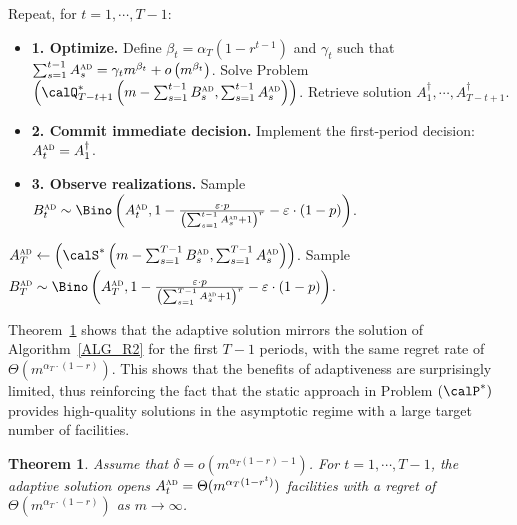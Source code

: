 \documentclass[11pt]{article}
\newtheorem{theorem}{Theorem}[] %
\begin{document}
\begin{algorithm} [h!]
\caption{Adaptive algorithm to solve Problem $(\calP^*)$.}\small
\label{alg:adaptive_R2}
\begin{algorithmic}
\item Repeat, for $t=1,\cdots,T-1$:
\begin{itemize}
    \item[] \textbf{1. Optimize.} Define $\beta_t=\alpha_T\left(1-r^{t-1}\right)$ and $\gamma_t$ such that $\sum_{s=1}^{t-1} A^{\textsc{ad}}_s=\gamma_t m^{\beta_t}+o\left(m^{\beta_t}\right)$. Solve Problem $\left(\calQ^*_{T-t+1}\left(m-\sum_{s=1}^{t-1}B^{\textsc{ad}}_s,\sum_{s=1}^{t-1} A^{\textsc{ad}}_s\right)\right)$. Retrieve solution $A^\dagger_1,\cdots,A^\dagger_{T-t+1}$.
    \item[] \textbf{2. Commit immediate decision.} Implement the first-period decision: $A^{\textsc{ad}}_t=A^\dagger_1$.
    \item[] \textbf{3. Observe realizations.} Sample $B^{\textsc{ad}}_t\sim \Bino\left(A^{\textsc{ad}}_t, 1- \frac{\varepsilon\cdot p}{\left(\sum_{s=1}^{t-1} A^{\textsc{ad}}_s +1\right)^r}-\varepsilon\cdot(1-p)\right)$.
\end{itemize}
\item $A^{\textsc{ad}}_T\gets\left(\calS^*\left(m-\sum_{s=1}^{T-1}B^{\textsc{ad}}_s,\sum_{s=1}^{T-1} A^{\textsc{ad}}_s\right)\right)$. Sample $B^{\textsc{ad}}_T\sim \Bino\left(A^{\textsc{ad}}_T, 1- \frac{\varepsilon\cdot p}{\left(\sum_{s=1}^{T-1} A^{\textsc{ad}}_s +1\right)^r}-\varepsilon\cdot(1-p)\right)$.
\end{algorithmic}
\end{algorithm}

Theorem~\ref{thm:adaptive_R2} shows that the adaptive solution mirrors the solution of Algorithm~\ref{ALG_R2} for the first $T-1$ periods, with the same regret rate of $\Theta\left(m^{\alpha_T\cdot(1-r)}\right)$. This shows that the benefits of adaptiveness are surprisingly limited, thus reinforcing the fact that the static approach in Problem $(\calP^*)$ provides high-quality solutions in the asymptotic regime with a large target number of facilities.
\setcounter{theorem}{3}
\begin{theorem}\label{thm:adaptive_R2}
	Assume that $\delta = o(m^{\alpha_T(1-r)-1})$. For $t=1,\cdots,T-1$, the adaptive solution opens $A^{\textsc{ad}}_t=\Theta(m^{\alpha_T(1-r^t)})$ facilities with a regret of $\Theta\left(m^{\alpha_T\cdot(1-r)}\right)$ as $m \to \infty$.
\end{theorem}
\end{document}
